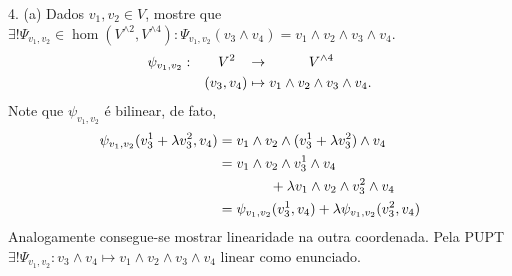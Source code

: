 4. (a) Dados \(v_1, v_2 \in V\), mostre que \(\exists ! \Psi_{v_1, v_2} \in \hom(V^{\wedge 2}, V^{\wedge 4})  : \Psi_{v_1, v_2}(v_3\wedge v_4) = v_1 \wedge v_2\wedge v_3 \wedge v_4\).  
\textcolor{gris}{
  \-\vspace{-0.3cm}
  \begin{align*}
    \psi_{v_1,v_2} : \hspace{0.6cm}V^2\hspace{0.3cm} &\to \hspace{1cm}V^{\wedge 4}\\ 
    (v_3, v_4) &\mapsto v_1\wedge v_2 \wedge v_3\wedge v_4.
  \end{align*}
  Note que \(\psi_{v_1, v_2}\) é bilinear, de fato, 
  \begin{align*}
    \psi_{v_1,v_2}(v_{3}^1 + \lambda v_{3}^2, v_4) &= v_1 \wedge v_2 \wedge (v_{3}^1 + \lambda v_{3}^2) \wedge v_4 \\ 
    &= v_1 \wedge v_2 \wedge v_{3}^1 \wedge v_4 \\
    & \hspace{1.3cm}+\lambda v_1 \wedge v_2 \wedge v_{3}^2 \wedge v_4\\ 
    &= \psi_{v_1,v_2}(v_{3}^1, v_4) + \lambda\psi_{v_1,v_2}(v_{3}^2, v_4)
  \end{align*}
  Analogamente consegue-se mostrar linearidade na outra coordenada. Pela PUPT \(\exists ! \Psi_{v_1,v_2}: v_3 \wedge v_4 \mapsto v_1 \wedge v_2 \wedge v_3 \wedge v_4\) linear como enunciado.   
}

